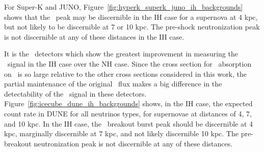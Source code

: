 For Super-K and JUNO,
Figure~\ref{fig:hyperk_superk_juno_ih_backgrounds} shows that
the \nue\ peak may be discernible in the IH case for a supernova at 4
kpc, but not likely to be discernible at 7 or 10 kpc.  The pre-shock
neutronization peak is not discernible at any of these
distances in the IH case.


It is the \ detectors which show the greatest improvement in
measuring the \nue\ signal in the IH case over the NH case.  Since
the cross section for \nue\ absorption on \ is so large relative to
the other cross sections considered in this work, the partial
maintenance of the original \nue\ flux makes a big difference in
the detectability of the \nue\ signal in these detectors.  
Figure~\ref{fig:icecube_dune_ih_backgrounds}
shows, in the IH case, the expected count rate in DUNE 
for all neutrinos types, for
supernovae at distances of 4, 7, and 10 kpc.  In the IH case, 
the \nue\ breakout burst
peak should be discernible at 4 kpc, marginally discernible at 7 kpc,
and not likely discernible 10 kpc.  The pre-breakout neutronization
peak is not discernible  at any of these distances.


